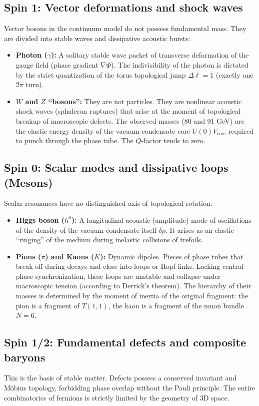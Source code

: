 \documentclass[11pt,a4paper]{article}
\begin{document}
\subsection{Spin 1: Vector deformations and shock waves}
Vector bosons in the continuum model do not possess fundamental mass. They are divided into stable waves and dissipative acoustic bursts:
\begin{itemize}
    \item \textbf{Photon ($\gamma$):} A solitary stable wave packet of transverse deformation of the gauge field (phase gradient $\nabla \Phi$). The indivisibility of the photon is dictated by the strict quantization of the torus topological jump $\Delta \ell = 1$ (exactly one $2\pi$ turn).
    \item \textbf{$W$ and $Z$ ``bosons'':} They are not particles. They are nonlinear acoustic shock waves (sphaleron ruptures) that arise at the moment of topological breakup of macroscopic defects. The observed masses (80 and 91 GeV) are the elastic energy density of the vacuum condensate core $U(0)V_{\text{core}}$ required to punch through the phase tube. The $Q$-factor tends to zero.
\end{itemize}

\subsection{Spin 0: Scalar modes and dissipative loops (Mesons)}
Scalar resonances have no distinguished axis of topological rotation.
\begin{itemize}
    \item \textbf{Higgs boson ($h^0$):} A longitudinal acoustic (amplitude) mode of oscillations of the density of the vacuum condensate itself $\delta \rho$. It arises as an elastic ``ringing'' of the medium during inelastic collisions of trefoils. 
    \item \textbf{Pions ($\pi$) and Kaons ($K$):} Dynamic dipoles. Pieces of phase tubes that break off during decays and close into loops or Hopf links. Lacking central phase synchronization, these loops are unstable and collapse under macroscopic tension (according to Derrick's theorem). The hierarchy of their masses is determined by the moment of inertia of the original fragment: the pion is a fragment of $T(1,1)$, the kaon is a fragment of the muon bundle $N=6$.
\end{itemize}

\subsection{Spin 1/2: Fundamental defects and composite baryons}
This is the basis of stable matter. Defects possess a conserved invariant and Möbius topology, forbidding phase overlap without the Pauli principle. The entire combinatorics of fermions is strictly limited by the geometry of 3D space.
\end{document}
